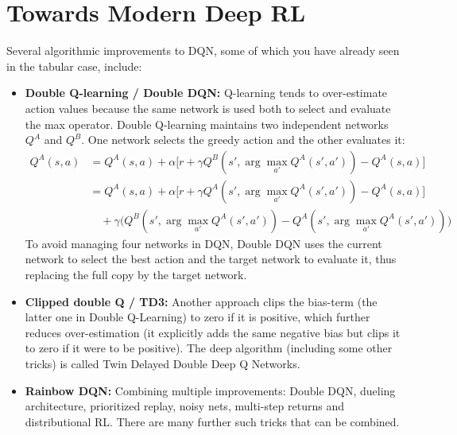 \documentclass[11pt,a4paper]{article}
\begin{document}
\section{Towards Modern Deep RL}
Several algorithmic improvements to DQN, some of which you have already seen in the tabular case, include:
\begin{itemize}
 \item \textbf{Double Q-learning / Double DQN:} Q-learning tends to
 over-estimate action values because the same network is used both to select
 and evaluate the max operator. Double Q-learning maintains two independent
 networks $Q^A$ and $Q^B$. One network selects the greedy action and the other
 evaluates it:
 \begin{equation}
 \begin{aligned}
 Q^A(s,a)
 &=Q^A(s,a)+\alpha\bigl[r+\gamma Q^B(s',\arg\max_{a'}Q^A(s',a'))-Q^A(s,a)\bigr]\\
 &=Q^A(s,a)+\alpha\bigl[r+\gamma Q^A(s',\arg\max_{a'}Q^A(s',a'))-Q^A(s,a)\bigr]\\
 &\quad+\gamma\bigl(Q^B(s',\arg\max_{a'}Q^A(s',a'))
 -Q^A(s',\arg\max_{a'}Q^A(s',a'))\bigr)
 \end{aligned}
 \end{equation}
 To avoid managing four networks in DQN, Double DQN uses the current
 network to select the best action and the target network to evaluate it,
 thus replacing the full copy by the target network.
 \item \textbf{Clipped double Q / TD3:} Another approach clips the bias-term
 (the latter one in Double Q-Learning) to zero if it is positive, which further
 reduces over-estimation (it explicitly adds the same negative bias but clips
 it to zero if it were to be positive). The deep algorithm (including some other tricks) is called Twin
 Delayed Double Deep Q Networks.
 \item \textbf{Rainbow DQN:} Combining multiple improvements: Double DQN,
 dueling architecture, prioritized replay, noisy nets, multi-step returns and
 distributional RL. There are many further such tricks that can be combined.
\end{itemize}
\end{document}
